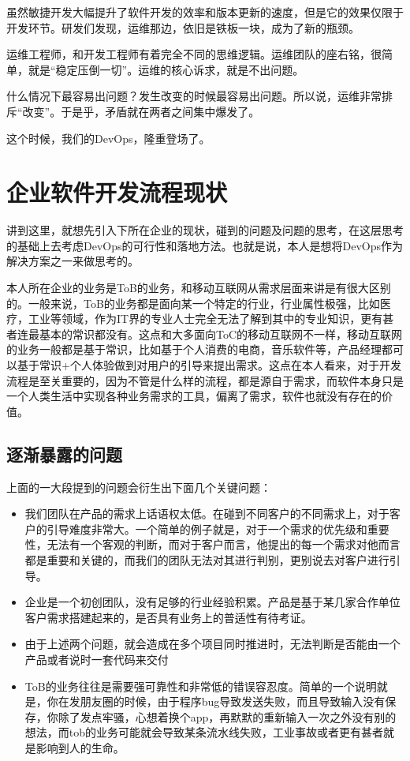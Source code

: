 \documentclass[12pt]{article}
\begin{document}
虽然敏捷开发大幅提升了软件开发的效率和版本更新的速度，但是它的效果仅限于开发环节。研发们发现，运维那边，依旧是铁板一块，成为了新的瓶颈。

运维工程师，和开发工程师有着完全不同的思维逻辑。运维团队的座右铭，很简单，就是“稳定压倒一切”。运维的核心诉求，就是不出问题。

什么情况下最容易出问题？发生改变的时候最容易出问题。所以说，运维非常排斥“改变”。于是乎，矛盾就在两者之间集中爆发了。

这个时候，我们的DevOps，隆重登场了。

\section{企业软件开发流程现状}
讲到这里，就想先引入下所在企业的现状，碰到的问题及问题的思考，在这层思考的基础上去考虑DevOps的可行性和落地方法。也就是说，本人是想将DevOps作为解决方案之一来做思考的。

本人所在企业的业务是ToB的业务，和移动互联网从需求层面来讲是有很大区别的。一般来说，ToB的业务都是面向某一个特定的行业，行业属性极强，比如医疗，工业等领域，作为IT界的专业人士完全无法了解到其中的专业知识，更有甚者连最基本的常识都没有。这点和大多面向ToC的移动互联网不一样，移动互联网的业务一般都是基于常识，比如基于个人消费的电商，音乐软件等，产品经理都可以基于常识+个人体验做到对用户的引导来提出需求。这点在本人看来，对于开发流程是至关重要的，因为不管是什么样的流程，都是源自于需求，而软件本身只是一个人类生活中实现各种业务需求的工具，偏离了需求，软件也就没有存在的价值。

\subsection{逐渐暴露的问题}
上面的一大段提到的问题会衍生出下面几个关键问题：

\begin{itemize}
\setlength{\itemsep}{0pt}
\setlength{\parsep}{0pt}
\setlength{\parskip}{0pt}
    \item 我们团队在产品的需求上话语权太低。在碰到不同客户的不同需求上，对于客户的引导难度非常大。一个简单的例子就是，对于一个需求的优先级和重要性，无法有一个客观的判断，而对于客户而言，他提出的每一个需求对他而言都是重要和关键的，而我们的团队无法对其进行判别，更别说去对客户进行引导。

    \item 企业是一个初创团队，没有足够的行业经验积累。产品是基于某几家合作单位客户需求搭建起来的，是否具有业务上的普适性有待考证。

    \item 由于上述两个问题，就会造成在多个项目同时推进时，无法判断是否能由一个产品或者说时一套代码来交付

    \item ToB的业务往往是需要强可靠性和非常低的错误容忍度。简单的一个说明就是，你在发朋友圈的时候，由于程序bug导致发送失败，而且导致输入没有保存，你除了发点牢骚，心想着换个app，再默默的重新输入一次之外没有别的想法，而tob的业务可能就会导致某条流水线失败，工业事故或者更有甚者就是影响到人的生命。
\end{itemize}
\end{document}
